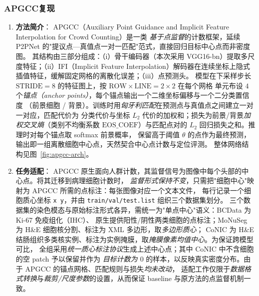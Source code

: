 
\subsubsection{APGCC复现}

\begin{enumerate}
    \item \textbf{方法简介}：
    APGCC（Auxiliary Point Guidance and Implicit Feature Interpolation for Crowd Counting）是一类
    \emph{基于点监督}的计数框架，延续 P2PNet 的"提议点—真值点一对一匹配"范式，直接回归目标中心点而非密度图。
    其结构由三部分组成：（i）骨干编码器（本次采用 VGG16-bn）提取多尺度特征；（ii）IFI（Implicit Feature
    Interpolation）解码器在连续坐标上隐式插值特征，缓解固定网格的离散化误差；（iii）点预测头。
    模型在下采样步长 $\text{STRIDE}=8$ 的特征图上，按 $\text{ROW}\times\text{LINE}=2\times2$ 在每个网格
    单元布设 $4$ 个\emph{锚点（anchor points）}，每个锚点输出一个二维坐标偏移与一个二分类置信度
    （前景细胞 / 背景）。训练时用\emph{匈牙利匹配}在预测点与真值点之间建立一对一对应，匹配代价为
    分类代价与坐标 $L_2$ 代价的加权和；损失为前景/背景\emph{加权交叉熵}（类别不均衡系数
    $\text{EOS\_COEF}$）与匹配点对的 $L_2$ 回归损失之和。推理时对每个锚点取 softmax 前景概率，
    保留高于阈值 $\theta$ 的点作为最终预测，输出即一组离散细胞中心点，天然契合中心点计数与定位评测。
    整体网络结构见图~\ref{fig:apgcc-arch}。

    \item \textbf{任务适配}：
    APGCC 原生面向人群计数，其监督信号为图像中每个头部的中心点。将其迁移到病理细胞计数时，
    \emph{监督形式保持不变}，只需把"细胞中心"映射为 APGCC 所需的点标注：每张图像对应一个文本文件，
    每行记录一个细胞质心坐标 \texttt{x\ y}，并由 \texttt{train/val/test.list} 组织三个数据集划分。
    三个数据集的染色模态与原始标注形式各异，需统一为"单点中心"语义：BCData 为 Ki-67 免疫组化（IHC）、
    原生提供阳性/阴性两类细胞的点标注；MoNuSeg 为 H\&E 细胞核分割、标注为 XML 多边形，取\emph{多边形质心}；
    CoNIC 为 H\&E 结肠组织多类核实例、标注为实例掩膜，取\emph{掩膜像素均值中心}。为保证跨模型可比，
    全组采用\emph{统一质心标注协议}生成上述中心点；其中 CoNIC 中不含细胞的空 patch 予以保留并作为
    \emph{目标计数为 $0$} 的样本，以反映真实密度分布。由于 APGCC 的锚点网格、匹配规则与损失\emph{均未改动}，
    适配工作仅限于\emph{数据格式转换}与\emph{裁剪/尺度参数}的设置，从而保证 baseline 与原方法的点监督机制一致。


\end{enumerate}
